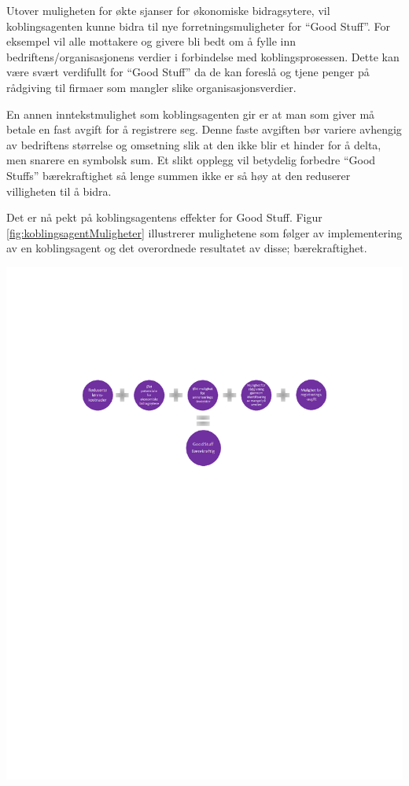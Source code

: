 Utover muligheten for økte sjanser for økonomiske bidragsytere, vil koblingsagenten kunne bidra til nye forretningsmuligheter for “Good Stuff”. For eksempel vil alle mottakere og givere bli bedt om å fylle inn bedriftens/organisasjonens verdier i forbindelse med koblingsprosessen. Dette kan være svært verdifullt for “Good Stuff” da de kan foreslå og tjene penger på rådgiving til firmaer som mangler slike organisasjonsverdier.

En annen inntekstmulighet som koblingsagenten gir er at man som giver må betale en fast avgift for å registrere seg. Denne faste avgiften bør variere avhengig av bedriftens størrelse og omsetning slik at den ikke blir et hinder for å delta, men snarere en symbolsk sum. Et slikt opplegg vil betydelig forbedre “Good Stuffs” bærekraftighet så lenge summen ikke er så høy at den reduserer villigheten til å bidra.

Det er nå pekt på koblingsagentens effekter for Good Stuff. Figur \ref{fig:koblingsagentMuligheter} illustrerer mulighetene som følger av implementering av en koblingsagent og det overordnede resultatet av disse; bærekraftighet.

\begin{center}
\includegraphics[clip=true, width=1 \textwidth,
trim=0cm 0cm 0cm 0cm]{koblingsagentMuligheter.pdf}
\label{fig:koblingsagentMuligheter}
\end{center}

